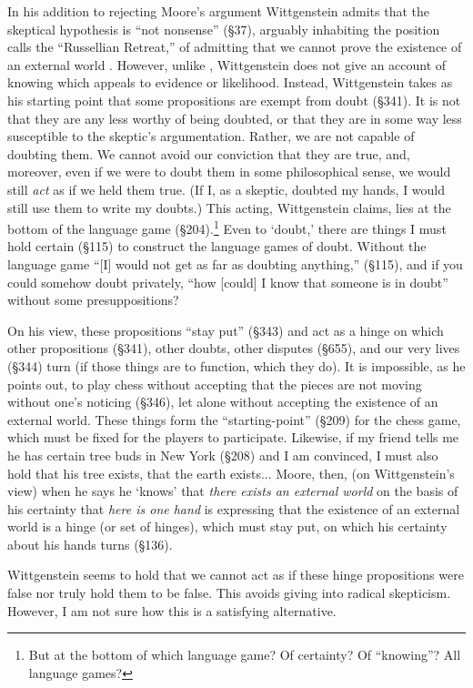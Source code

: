 \documentclass[doc,12pt,apacite,biblatex]{apa6}
\begin{document}
In his addition to rejecting Moore's argument Wittgenstein admits that the
skeptical hypothesis is ``not nonsense'' (\S 37), arguably inhabiting the
position  calls the ``Russellian Retreat,'' of admitting that
we cannot prove the existence of an external world \cite{Robinson}.  However,
unlike , Wittgenstein does not give an account of knowing
which appeals to evidence or likelihood.  Instead, Wittgenstein takes as his
starting point that some propositions are exempt from doubt (\S 341). It is not
that they are any less worthy of being doubted, or that they are in some way
less susceptible to the skeptic's argumentation. Rather, we are not capable of
doubting them. We cannot avoid our conviction that they are true, and,
moreover, even if we were to doubt them in some philosophical sense, we would
still \emph{act} as if we held them true.  (If I, as a skeptic, doubted my
hands, I would still use them to write my doubts.) This acting, Wittgenstein
claims, lies at the bottom of the language game (\S 204).\footnote{But at the
bottom of which language game? Of certainty?  Of ``knowing''? All language
games?}
Even to `doubt,' there are things I must hold certain (\S 115) to construct the
language games of doubt. Without the language game ``[I] would not get as far
as doubting anything,'' (\S 115), and if you could somehow doubt privately,
``how [could] I know that someone is in doubt'' without some presuppositions?

On his view, these propositions ``stay put'' (\S 343) and act as a hinge on
which other propositions (\S 341), other doubts, other disputes (\S 655), and
our very lives (\S 344) turn (if those things are to function, which they do).
It is impossible, as he points out, to play chess without accepting that the
pieces are not moving without one's noticing (\S 346), let alone without
accepting the existence of an external world. These things form the
``starting-point'' (\S 209) for the chess game, which must be fixed for the
players to participate. Likewise, if my friend tells me he has certain tree
buds in New York (\S 208) and I am convinced, I must also hold that his tree
exists, that the earth exists...
Moore, then, (on Wittgenstein's view) when he says he `knows' that \emph{there
exists an external world} on the basis of his certainty that \emph{here is one
hand} is expressing that the existence of an external world is a hinge (or set
of hinges), which must stay put, on which his certainty about his hands turns
(\S 136).

Wittgenstein seems to hold that we cannot act as if these hinge propositions
were false nor truly hold them to be false. This avoids giving into radical
skepticism. However, I am not sure how this is a satisfying alternative.

\clearpage


\end{document}

